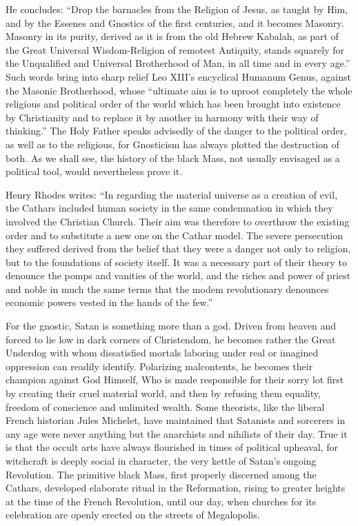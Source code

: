 He concludes: ``Drop the barnacles from the Religion of Jesus, as taught by Him, and by the Essenes and Gnostics of the first centuries, and it becomes Masonry. Masonry in its purity, derived as it is from the old Hebrew Kabalah, as part of the Great Universal Wisdom-Religion of remotest Antiquity, stands squarely for the Unqualified and Universal Brotherhood of Man, in all time and in every age.'' Such words bring into sharp relief Leo XIII's encyclical Humanum Genus, against the Masonic Brotherhood, whose ``ultimate aim is to uproot completely the whole religious and political order of the world which has been brought into existence by Christianity and to replace it by another in harmony with their way of thinking.'' The Holy Father speaks advisedly of the danger to the political order, as well as to the religious, for Gnosticism has always plotted the destruction of both. As we shall see, the history of the black Mass, not usually envisaged as a political tool, would nevertheless prove it.

Henry Rhodes writes: ``In regarding the material universe as a creation of evil, the Cathars included human society in the same condemnation in which they involved the Christian Church. Their aim was therefore to overthrow the existing order and to substitute a new one on the Cathar model. The severe persecution they suffered derived from the belief that they were a danger not only to religion, but to the foundations of society itself. It was a necessary part of their theory to denounce the pomps and vanities of the world, and the riches and power of priest and noble in much the same terms that the modem revolutionary denounces economic powers vested in the hands of the few.''

For the gnostic, Satan is something more than a god. Driven from heaven and forced to lie low in dark corners of Christendom, he becomes rather the Great Underdog with whom dissatisfied mortals laboring under real or imagined oppression can readily identify. Polarizing malcontents, he becomes their champion against God Himself, Who is made responsible for their sorry lot first by creating their cruel material world, and then by refusing them equality, freedom of conscience and unlimited wealth. Some theorists, like the liberal French historian Jules Michelet, have maintained that Satanists and sorcerers in any age were never anything but the anarchists and nihilists of their day. True it is that the occult arts have always flourished in times of political upheaval, for witchcraft is deeply social in character, the very kettle of Satan's ongoing Revolution. The primitive black Mass, first properly discerned among the Cathars, developed elaborate ritual in the Reformation, rising to greater heights at the time of the French Revolution, until our day, when churches for its celebration are openly erected on the streets of Megalopolis.

